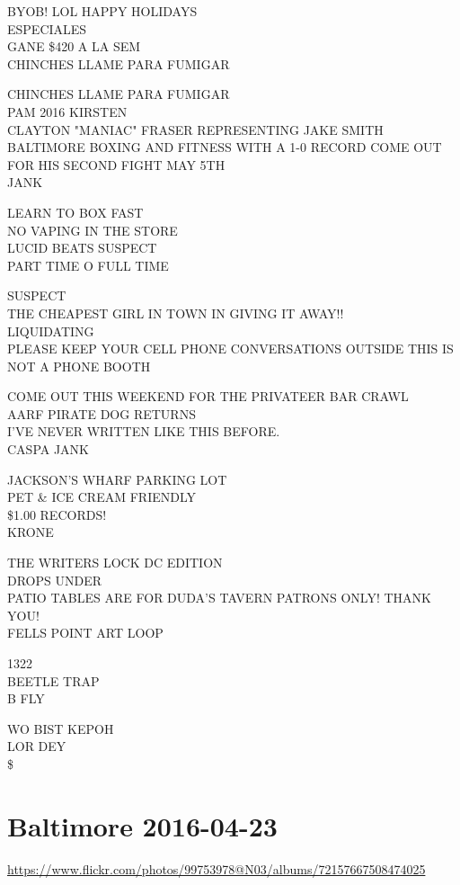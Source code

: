 \documentclass[10pt,letterpaper]{article}
\begin{document}
BYOB! LOL HAPPY HOLIDAYS\\
ESPECIALES\\
GANE \$420 A LA SEM\\
CHINCHES LLAME PARA FUMIGAR

CHINCHES LLAME PARA FUMIGAR\\
PAM 2016 KIRSTEN\\
CLAYTON "MANIAC" FRASER REPRESENTING JAKE SMITH BALTIMORE BOXING AND FITNESS WITH A 1{-}0 RECORD COME OUT FOR HIS SECOND FIGHT MAY 5TH\\
JANK

LEARN TO BOX FAST\\
NO VAPING IN THE STORE\\
LUCID BEATS SUSPECT\\
PART TIME O FULL TIME

SUSPECT\\
THE CHEAPEST GIRL IN TOWN IN GIVING IT AWAY!!\\
LIQUIDATING\\
PLEASE KEEP YOUR CELL PHONE CONVERSATIONS OUTSIDE THIS IS NOT A PHONE BOOTH

COME OUT THIS WEEKEND FOR THE PRIVATEER BAR CRAWL\\
AARF PIRATE DOG RETURNS\\
I'VE NEVER WRITTEN LIKE THIS BEFORE.\\
CASPA JANK

JACKSON'S WHARF PARKING LOT\\
PET \& ICE CREAM FRIENDLY\\
\$1.00 RECORDS!\\
KRONE

THE WRITERS LOCK DC EDITION\\
DROPS UNDER\\
PATIO TABLES ARE FOR DUDA'S TAVERN PATRONS ONLY!  THANK YOU!\\
FELLS POINT ART LOOP

1322\\
BEETLE TRAP\\
B FLY

WO BIST KEPOH\\
LOR DEY\\
\$
\

\section*{Baltimore 2016-04-23}

\url{https://www.flickr.com/photos/99753978@N03/albums/72157667508474025}
\end{document}
